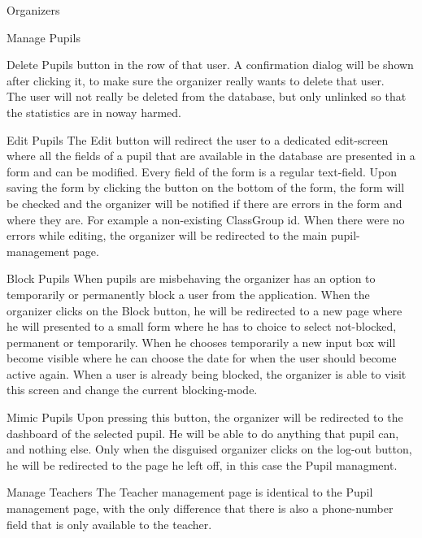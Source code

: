\begin{section}{Organizers}
\begin{subsection}{Manage Pupils}
\begin{subsubsection}{Delete Pupils}
			button in the row of that user. A confirmation dialog will be shown after
			clicking it, to make sure the organizer really wants to delete that user. \\
			The user will not really be deleted from the database, but only unlinked so
			that the statistics are in noway harmed.
		\end{subsubsection}
		\begin{subsubsection}{Edit Pupils}
			\label{sec:organizer_edit_pupils}
			The Edit button will redirect the user to a dedicated edit-screen where all
			the fields of a pupil that are available in the database are presented in a
			form and can be modified. Every field of the form is a regular text-field.
			Upon saving the form by clicking the button on the bottom of the form, the
			form will be checked and the organizer will be notified if there are errors
			in the form and where they are. For example a non-existing ClassGroup id.
			When there were no errors while editing, the organizer will be redirected to
			the main pupil-management page.
		\end{subsubsection}
		\begin{subsubsection}{Block Pupils}
			When pupils are misbehaving the organizer has an option to temporarily or
			permanently block a user from the application. When the organizer clicks on
			the Block button, he will be redirected to a new page where he will presented
			to a small form where he has to choice to select not-blocked, permanent or
			temporarily. When he chooses temporarily a new input box will become visible
			where he can choose the date for when the user should become active again.
			When a user is already being blocked,
			the organizer is able to visit this screen and change the current
			blocking-mode.
		\end{subsubsection}
		\begin{subsubsection}{Mimic Pupils}
			Upon pressing this button, the organizer will be redirected to the dashboard
			of the selected pupil. He will be able to do anything that pupil can, and
			nothing else. Only when the disguised organizer clicks on the log-out button,
			he will be redirected to the page he left off, in this case the Pupil
			managment.
		\end{subsubsection}
		
	\end{subsection}
	
	\begin{subsection}{Manage Teachers}
		The Teacher management page is identical to the Pupil management page, with the
		only difference that there is also a phone-number field that is only available
		to the teacher.
	\end{subsection}
	

\end{section}

